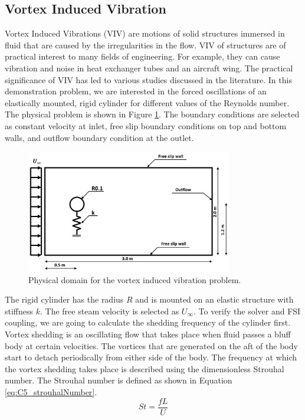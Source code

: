 \subsection{Vortex Induced Vibration}
Vortex Induced Vibrations (VIV) are motions of solid structures immersed in fluid that are caused by the irregularities in the flow. VIV of structures are of practical interest to many fields of engineering. For example, they can cause vibration and noise in heat exchanger tubes and an aircraft wing. The practical significance of VIV has led to various studies discussed in the literature\cite{williamson2004vortex}. In this demonstration problem, we are interested in the forced oscillations of an elastically mounted, rigid cylinder for different values of the Reynolds number. The physical problem is shown in Figure \ref{fig:C5_cylinderShape}. The boundary conditions are selected as constant velocity at inlet, free slip boundary conditions on top and bottom walls, and outflow boundary condition at the outlet.
%
\begin{figure}[H]
    \centering
    \includegraphics[width=9.00cm]{Chapter_5/figure/VIV_domain_shape.jpg}
    \caption{Physical domain for the vortex induced vibration problem.}
    \label{fig:C5_cylinderShape}
\end{figure}
%
The rigid cylinder has the radius $R$ and is mounted on an elastic structure with stiffness $k$. The free steam velocity is selected as $U_\infty$. To verify the solver and FSI coupling, we are going to calculate the shedding frequency of the cylinder first. Vortex shedding is an oscillating flow that takes place when fluid passes a bluff body at certain velocities. The vortices that are generated on the aft of the body start to detach periodically from either side of the body. The frequency at which the vortex shedding takes place is described using the dimensionless Strouhal number. The Strouhal number is defined as shown in Equation \eqref{eq:C5_strouhalNumber}.
%
\begin{equation}\label{eq:C5_strouhalNumber}
	St = \frac{fL}{U}
\end{equation}
